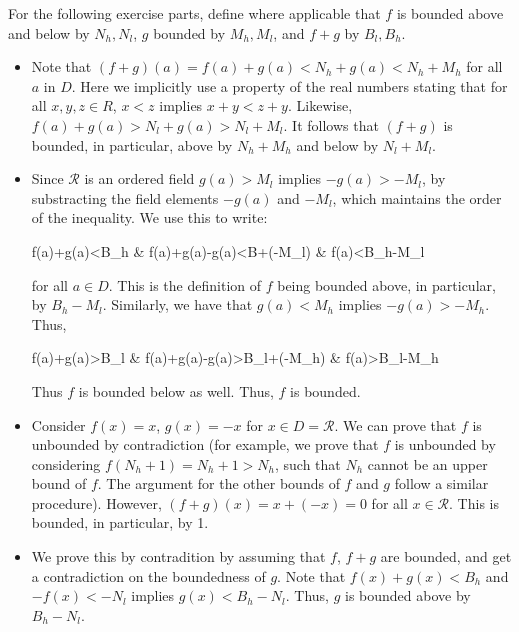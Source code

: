 \documentclass[11 pt]{article}
\begin{document}
\begin{solution}
For the following exercise parts, define where applicable that $f$ is bounded above and below by $N_h, N_l$, $g$ bounded by $M_h, M_l$, and $f+g$ by $B_l, B_h$. 
	\begin{itemize}
	\item Note that $(f+g)(a)=f(a)+g(a)<N_h+g(a)<N_h+M_h$ for all $a$ in $D$. Here we implicitly use a property of the real numbers stating that for all $x,y,z\in R$, $x<z$ implies $x+y<z+y$.
	Likewise,  $f(a)+g(a)>N_l+g(a)>N_l+M_l$.
	It follows that  $(f+g)$ is bounded, in particular, above by $N_h+M_h$ and below by $N_l+M_l$.

	\item Since $\mathcal{R}$ is an ordered field $g(a)>M_l$ implies $-g(a)>-M_l$, by substracting the field elements $-g(a)$ and $-M_l$, which maintains the order of the inequality. We use this to write:\\
	\begin{center}
	\begin{gathered}
		f(a)+g(a)<B_h &
		f(a)+g(a)-g(a)<B+(-M_l) &
		f(a)<B_h-M_l
	\end{gathered}
	\end{center}
	for all $a\in D$. This is the definition of $f$ being bounded above, in particular, by $B_h-M_l$. Similarly, we have that $g(a)<M_h$ implies $-g(a)>-M_h$. Thus,\\
	\begin{center}
	\begin{gathered}
		f(a)+g(a)>B_l &
		f(a)+g(a)-g(a)>B_l+(-M_h) &
		f(a)>B_l-M_h
	\end{gathered}
	\end{center}
	Thus $f$ is bounded below as well. Thus, $f$ is bounded.

\item Consider $f(x)=x$, $g(x)=-x$ for $x \in D=\mathcal{R}$. We can prove that $f$ is unbounded by contradiction (for example, we prove that $f$ is unbounded by considering $f(N_h+1)=N_h+1>N_h$, such that $N_h$ cannot be an upper bound of $f$. The argument for the other bounds of $f$ and $g$ follow a similar procedure).
	However, $(f+g)(x)=x+(-x)=0$ for all $x\in\mathcal{R}$. This is bounded, in particular, by 1.

\item We prove this by contradition by assuming that $f$,  $f+g$ are bounded, and get a contradiction on the boundedness of $g$.
 Note that $f(x)+g(x)<B_h$ and $-f(x)<-N_l$ implies $g(x)<B_h-N_l$. Thus, $g$ is bounded above by $B_h-N_l$.
	\end{itemize}
\end{solution}
\end{document}
